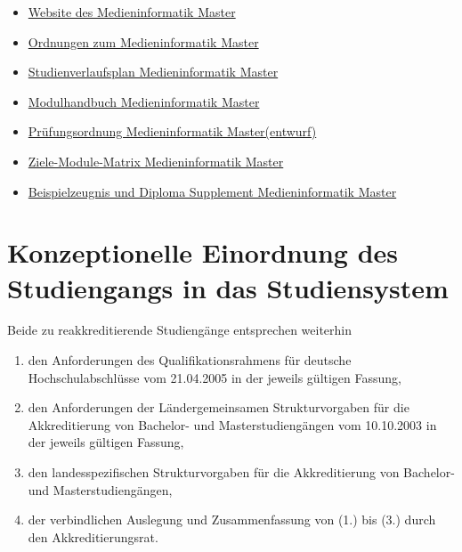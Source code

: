 \begin{itemize}
\tightlist
\item
  \href{https://www.th-koeln.de/studium/medieninformatik-master_3729.php}{Website
  des Medieninformatik Master}
\item
  \href{https://www.th-koeln.de/studium/medieninformatik-master--ordnungen-und-formulare_3724.php}{Ordnungen
  zum Medieninformatik Master}
\item
  \href{https://th-koeln.github.io/mi-2017/anhaenge/ma-studienverlaufsplan.pdf}{Studienverlaufsplan
  Medieninformatik Master}
\item
  \href{https://th-koeln.github.io/mi-2017/download/modulbeschreibungen-master.pdf}{Modulhandbuch
  Medieninformatik Master}
\item
  \href{https://th-koeln.github.io/mi-2017/anhaenge/ma-MIMPO_Entwurf_20170218.pdf}{Prüfungsordnung
  Medieninformatik Master(entwurf)}
\item
  \href{https://th-koeln.github.io/mi-2017/anhaenge/ma-Ziele-Module-Matrix-Medieninformatik-Master.pdf}{Ziele-Module-Matrix
  Medieninformatik Master}
\item
  \href{https://th-koeln.github.io/mi-2017/anhaenge/ma-zeugnis.pdf}{Beispielzeugnis und Diploma
  Supplement Medieninformatik Master}
\end{itemize}

\chapter{Konzeptionelle Einordnung des Studiengangs in das
Studiensystem\label{/mi-2017/selbstbericht/0300-konzeptionelle-einordnung/0000-konzeptionelle-einordnung}}\label{konzeptionelle-einordnung-des-studiengangs-in-das-studiensystempathlabelmi-2017selbstbericht0300-konzeptionelle-einordnung0000-konzeptionelle-einordnung}

Beide zu reakkreditierende Studiengänge entsprechen weiterhin

\begin{enumerate}
\def\labelenumi{\arabic{enumi}.}
\item
  den Anforderungen des Qualifikationsrahmens für deutsche
  Hochschulabschlüsse vom 21.04.2005 in der jeweils gültigen Fassung,
\item
  den Anforderungen der Ländergemeinsamen Strukturvorgaben für die
  Akkreditierung von Bachelor- und Masterstudiengängen vom 10.10.2003 in
  der jeweils gültigen Fassung,
\item
  den landesspezifischen Strukturvorgaben für die Akkreditierung von
  Bachelor- und Masterstudiengängen,
\item
  der verbindlichen Auslegung und Zusammenfassung von (1.) bis (3.)
  durch den Akkreditierungsrat.
\end{enumerate}

